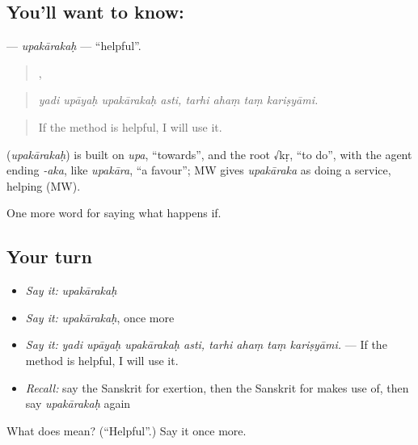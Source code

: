 \subsection*{You'll want to know: }
\textbf{} — \emph{upakārakaḥ} — \textquotedblleft{}helpful\textquotedblright{}.

\begin{quote}
   ,    
\end{quote}

\begin{quote}
\emph{yadi upāyaḥ upakārakaḥ asti, tarhi ahaṃ taṃ kariṣyāmi.}
\end{quote}

\begin{quote}
If the method is helpful, I will use it.
\end{quote}

\begin{cousinweb}
\textbf{} (\emph{upakārakaḥ}) is built on \emph{upa}, \textquotedblleft{}towards\textquotedblright{}, and the root √kṛ, \textquotedblleft{}to do\textquotedblright{}, with the agent ending \emph{-aka}, like \emph{upakāra}, \textquotedblleft{}a favour\textquotedblright{}; MW gives \emph{upakāraka} as doing a service, helping (MW).
\end{cousinweb}

\begin{grammarlens}[title={What you've built}]
One more word for saying what happens if.
\end{grammarlens}

\subsection*{Your turn}
\begin{itemize}
\raggedright
  \item \emph{Say it:} \emph{upakārakaḥ}
  \item \emph{Say it:} \emph{upakārakaḥ}, once more
  \item \emph{Say it:} \emph{yadi upāyaḥ upakārakaḥ asti, tarhi ahaṃ taṃ kariṣyāmi.} — If the method is helpful, I will use it.
  \item \emph{Recall:} say the Sanskrit for exertion, then the Sanskrit for makes use of, then say \emph{upakārakaḥ} again
\end{itemize}

\begin{tcolorbox}[breakable,colback=teal!4,colframe=teal!35!black,title={Before you move on}]
What does  mean? (\textquotedblleft{}Helpful\textquotedblright{}.) Say it once more.
\end{tcolorbox}
